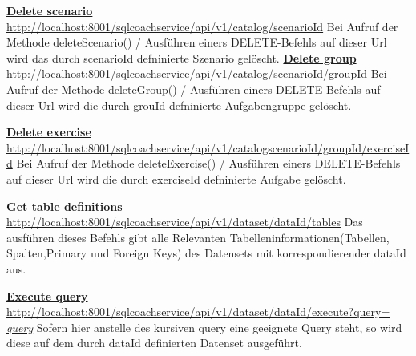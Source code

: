 \documentclass[fleqn,10pt,ngerman]{SelfArx}
\begin{document}
	\noindent
	
	\noindent
		\underline{\textbf{Delete scenario}}\newline
	\underline{http://localhost:8001/sqlcoachservice/api/v1/catalog/scenarioId}
	Bei Aufruf der Methode deleteScenario() / Ausführen einers DELETE-Befehls auf dieser Url wird das durch scenarioId defninierte Szenario gelöscht.
		\newline\newline
	\noindent
			\underline{\textbf{Delete group}}\newline
	\underline{http://localhost:8001/sqlcoachservice/api/v1/catalog}\newline\underline{/scenarioId/groupId}\newline
	Bei Aufruf der Methode deleteGroup() / Ausführen einers DELETE-Befehls auf dieser Url wird die durch grouId defninierte Aufgabengruppe gelöscht.
	\newline\newline
	
	\noindent
	\underline{\textbf{Delete exercise}}\newline
	\underline{http://localhost:8001/sqlcoachservice/api/v1/catalog}\newline\underline{scenarioId/groupId/exerciseId}\newline
	Bei Aufruf der Methode deleteExercise() / Ausführen einers DELETE-Befehls auf dieser Url wird die durch exerciseId defninierte Aufgabe gelöscht.
		\newline\newline
	
	\noindent
	\underline{\textbf{Get table definitions}}\newline
	\underline{http://localhost:8001/sqlcoachservice/api/v1}\newline \underline{/dataset/dataId/tables}\newline
	Das ausführen dieses Befehls gibt alle Relevanten Tabelleninformationen(Tabellen, Spalten,Primary und Foreign Keys) des Datensets mit korrespondierender dataId aus.
	\newline\newline
	
	\noindent
	\underline{\textbf{Execute query}}\newline
	\underline{http://localhost:8001/sqlcoachservice/api/v1}\newline \underline{/dataset/dataId/execute?query= \textit{query}}\newline
	Sofern hier anstelle des kursiven query eine geeignete Query steht, so wird diese auf dem durch dataId definierten Datenset ausgeführt.
	
\end{document}

